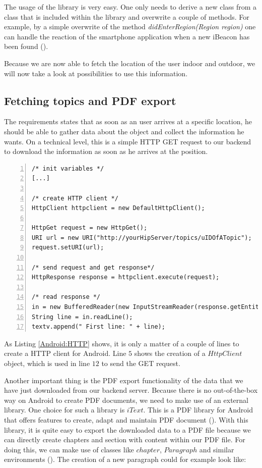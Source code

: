 The usage of the library is very easy. One only needs to derive a new class from a class that is included within the library and overwrite a couple of methods. For example, by a simple overwrite of the method \emph{didEnterRegion(Region region)} one can handle the reaction of the smartphone application when a new iBeacon has been found (\cite{RadiusNetworks:2015ab}).   

Because we are now able to fetch the location of the user indoor and outdoor, we will now take a look at possibilities to use this information.

\subsection{Fetching topics and PDF export}
The requirements states that as soon as an user arrives at a specific location, he should be able to gather data about the object and collect the information he wants. On a technical level, this is a simple \ac{HTTP} GET request to our backend to download the information as soon as he arrives at the position.

\begin{lstlisting}[numbers=left,caption={Creation and usage of an Android \ac{HTTP} client.},label=Android:HTTP,frame=tlbr,breaklines]
/* init variables */
[...]

/* create HTTP client */
HttpClient httpclient = new DefaultHttpClient();

HttpGet request = new HttpGet();
URI url = new URI("http://yourHipServer/topics/uIDOfATopic");
request.setURI(url);

/* send request and get response*/
HttpResponse response = httpclient.execute(request);

/* read response */
in = new BufferedReader(new InputStreamReader(response.getEntity().getContent()));
String line = in.readLine();
textv.append(" First line: " + line);
\end{lstlisting}

As Listing \ref{Android:HTTP} shows, it is only a matter of a couple of lines to create a \ac{HTTP} client for Android. Line $5$ shows the creation of a $HttpClient$ object, which is used in line $12$ to send the GET request.

Another important thing is the \ac{PDF} export functionality of the data that we have just downloaded from our backend server.
Because there is no out-of-the-box way on Android to create \ac{PDF} documents, we need to make use of an external library. One choice for such a library is $iText$. This is a \ac{PDF} library for Android that offers features to create, adapt and maintain \ac{PDF} document (\cite{itext2015}).
With this library, it is quite easy to export the downloaded data to a \ac{PDF} file because we can directly create chapters and section with content within our \ac{PDF} file. For doing this, we can make use of classes like $chapter$, $Paragraph$ and similar environments (\cite{pdfCreation}). The creation of a new paragraph could for example look like:

